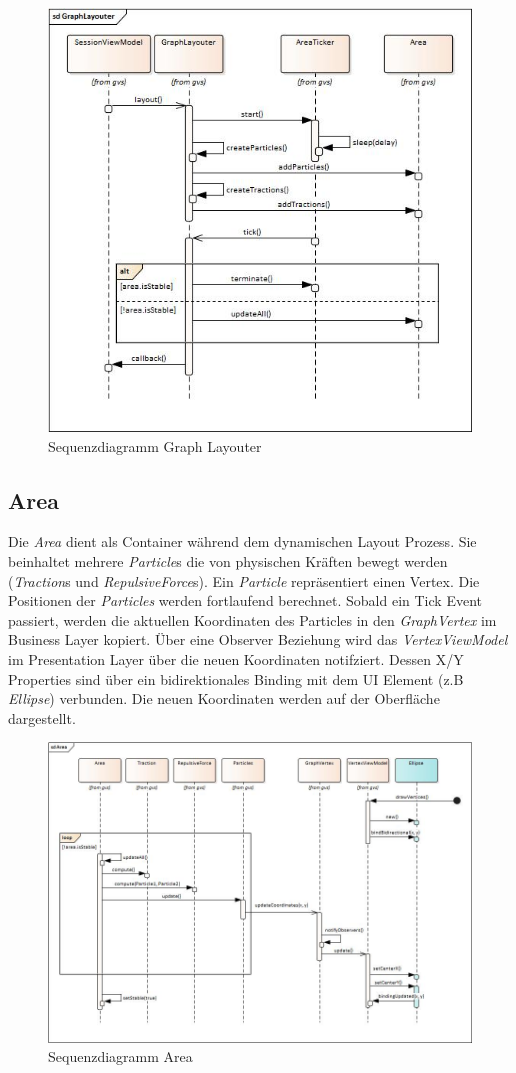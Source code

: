 \documentclass[11pt,a4paper,english,oneside]{book}
\numberwithin{equation}{chapter}
\begin{document}
	\begin{figure}[h!]
		\centering
		\includegraphics[width=0.6\linewidth]{assets/images/sequence_graph_layouter}
		\caption{Sequenzdiagramm Graph Layouter}
		\label{fig:sequencegraphlayouter}
	\end{figure}
	
	\subsection{Area} \label{ssec:area}
	Die \textit{Area} dient als Container während dem dynamischen Layout Prozess. Sie beinhaltet mehrere \textit{Particle}s die von physischen Kräften bewegt werden (\textit{Traction}s und \textit{RepulsiveForce}s). Ein \textit{Particle} repräsentiert einen Vertex. Die Positionen der \textit{Particles} werden fortlaufend berechnet. Sobald ein Tick Event passiert, werden die aktuellen Koordinaten des Particles in den \textit{GraphVertex} im Business Layer kopiert. 	Über eine Observer Beziehung wird das \textit{VertexViewModel} im Presentation Layer über die neuen Koordinaten notifziert. Dessen X/Y Properties sind über ein bidirektionales Binding mit dem UI Element (z.B \textit{Ellipse}) verbunden. Die neuen Koordinaten werden auf der Oberfläche dargestellt. 
	
	\begin{figure}[h!]
		\centering
		\includegraphics[width=0.8\linewidth]{assets/images/sequence_area}
		\caption{Sequenzdiagramm Area}
		\label{fig:sequencearea}
	\end{figure}
\end{document}
